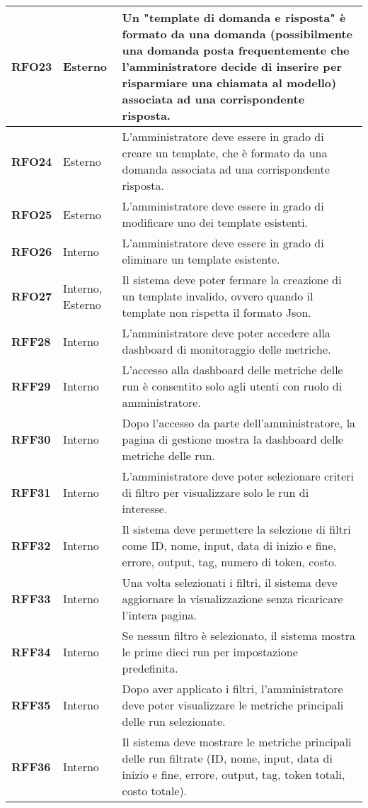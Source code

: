 \begin{longtable}{|>{\centering\arraybackslash}m{}|>{\centering\arraybackslash}m{}|>{\arraybackslash}m{}|}
	\hline
	\textbf{RFO23} & Esterno 			& Un "template di domanda e risposta" è formato da una domanda (possibilmente una domanda posta frequentemente che l'amministratore decide di inserire per risparmiare una chiamata al modello) associata ad una corrispondente risposta. \\
	\hline
	\textbf{RFO24} & Esterno 			& L'amministratore deve essere in grado di creare un template, che è formato da una domanda associata ad una corrispondente risposta. \\
	\hline
	\textbf{RFO25} & Esterno 			& L'amministratore deve essere in grado di modificare uno dei template esistenti. \\
	\hline
	\textbf{RFO26} & Interno 			& L'amministratore deve essere in grado di eliminare un template esistente. \\
	\hline
	\textbf{RFO27} & Interno, Esterno 	& Il sistema deve poter fermare la creazione di un template invalido, ovvero quando il template non rispetta il formato Json. \\
	\hline
	\textbf{RFF28} & Interno 			& L'amministratore deve poter accedere alla dashboard di monitoraggio delle metriche. \\
	\hline
	\textbf{RFF29} & Interno 			& L’accesso alla dashboard delle metriche delle run è consentito solo agli utenti con ruolo di amministratore. \\
	\hline
	\textbf{RFF30} & Interno 			& Dopo l’accesso da parte dell'amministratore, la pagina di gestione mostra la dashboard delle metriche delle run. \\
	\hline
	\textbf{RFF31} & Interno 			& L’amministratore deve poter selezionare criteri di filtro per visualizzare solo le run di interesse. \\
	\hline
	\textbf{RFF32} & Interno 			& Il sistema deve permettere la selezione di filtri come ID, nome, input, data di inizio e fine, errore, output, tag, numero di token, costo. \\
	\hline
	\textbf{RFF33} & Interno 			& Una volta selezionati i filtri, il sistema deve aggiornare la visualizzazione senza ricaricare l'intera pagina. \\
	\hline
	\textbf{RFF34} & Interno 			& Se nessun filtro è selezionato, il sistema mostra le prime dieci run per impostazione predefinita. \\
	\hline
	\textbf{RFF35} & Interno 			& Dopo aver applicato i filtri, l’amministratore deve poter visualizzare le metriche principali delle run selezionate. \\
	\hline
	\textbf{RFF36} & Interno 			& Il sistema deve mostrare le metriche principali delle run filtrate (ID, nome, input, data di inizio e fine, errore, output, tag, token totali, costo totale). \\

\end{longtable}
